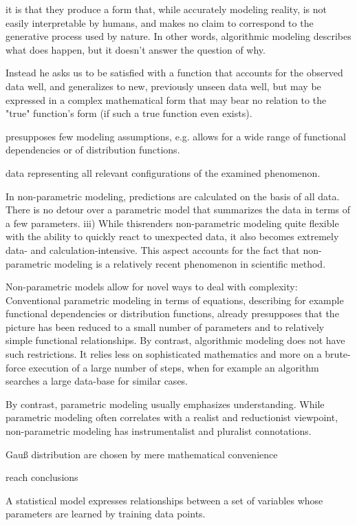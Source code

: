 \documentclass[authoryear,review,3p]{elsarticle}
\begin{document}
it is that they produce a form that, while accurately modeling reality, is not easily interpretable by humans, and makes no claim to correspond to the generative process used by nature. In other words, algorithmic modeling describes what does happen, but it doesn't answer the question of why.

Instead he asks us to be satisfied with a function that accounts for the observed data well, and generalizes to new, previously unseen data well, but may be expressed in a complex mathematical form that may bear no relation to the "true" function's form (if such a true function even exists).

presupposes few modeling assumptions, e.g. allows for a wide range of functional dependencies or of distribution functions.

data representing all relevant configurations of the examined phenomenon.

In non-parametric modeling, predictions are calculated on the basis of all data. There is no detour over a parametric model that summarizes the data in terms of a few parameters. iii) While thisrenders non-parametric modeling quite flexible with the ability to quickly react to unexpected data, it also becomes extremely data- and calculation-intensive. This aspect accounts for the fact that non-parametric modeling is a relatively recent phenomenon in scientific method.

Non-parametric models allow for novel ways to deal with complexity:
Conventional parametric modeling in terms of equations, describing for example functional dependencies or distribution functions, already presupposes that the picture has been reduced to a small number of parameters and to relatively simple functional relationships. By contrast, algorithmic modeling does not have such restrictions. It relies less on sophisticated mathematics and more on a brute-force execution of a large number of steps, when for example an algorithm searches a large data-base for similar cases. 

By contrast, parametric modeling usually emphasizes understanding. While parametric modeling often correlates with a realist and reductionist viewpoint, non-parametric modeling has instrumentalist and pluralist connotations.


Gauß distribution are chosen by mere mathematical convenience

reach conclusions


A statistical model expresses relationships between a set of variables
whose parameters are learned by training data points.
\end{document}

